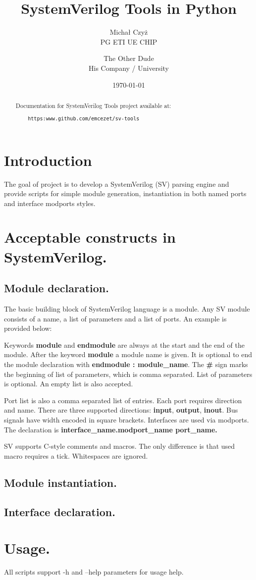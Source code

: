 \documentclass{article}
\title{SystemVerilog Tools in Python}
\author{Michał Czyż  \\
    PG ETI UE CHIP \\
    \and 
    The Other Dude \\
    His Company / University \\
    }
\date{\today}
\begin{document}
\maketitle
\tableofcontents
\newpage

\begin{abstract}
Documentation for SystemVerilog Tools project available at:
\begin{verbatim}
    https:www.github.com/emcezet/sv-tools
\end{verbatim}

\end{abstract}

\section{Introduction}
{ The goal of project is to develop a SystemVerilog (SV) parsing engine and
provide scripts for simple module generation, instantiation in both
named ports and interface modports styles. }

\section{Acceptable constructs in SystemVerilog.}

\subsection{Module declaration.}
{ The basic building block of SystemVerilog language is a module. Any SV module
consists of a name, a list of parameters and a list of ports. An example is
provided below: }



{ Keywords \textbf{module} and \textbf{endmodule} are always at the start and
 the end of the module. After the keyword \textbf{module} a module name is given.
 It is optional to end the module declaration with \textbf{endmodule : module\_name}.
 The \textbf{\#} sign marks the beginning of list of parameters, which is comma separated.
 List of parameters is optional. An empty list is also accepted.}

{ Port list is also a comma separated list of entries. Each port requires direction
and name. There are three supported directions: \textbf{input}, \textbf{output},
\textbf{inout}. Bus signals have width encoded in square brackets. Interfaces are
used via modports. The declaration is \textbf{interface\_name.modport\_name port\_name.} }

{ SV supports C-style comments and macros. The only difference is that used macro
requires a tick. Whitespaces are ignored.}

\subsection{Module instantiation.}

\subsection{Interface declaration.}

\section{Usage.}
{ All scripts support -h and --help parameters for usage help.}
\end{document}
